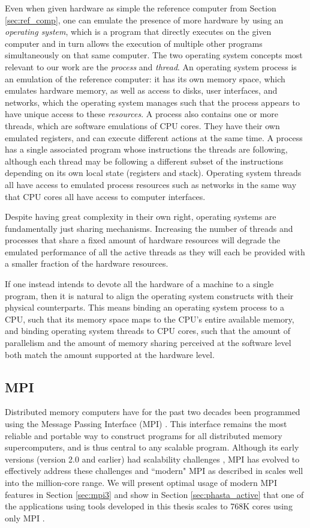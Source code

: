 Even when given hardware as simple the reference
computer from Section \ref{sec:ref_comp}, one can emulate
the presence of more hardware by using an \emph{operating system},
which is a program that directly executes on the given computer
and in turn allows the execution of multiple other programs
simultaneously on that same computer.
The two operating system concepts most relevant to our work
are the \emph{process} and \emph{thread}.
An operating system process is an emulation of the reference computer:
it has its own memory space, which emulates hardware memory,
as well as access to disks, user interfaces, and networks,
which the operating system manages such that the process
appears to have unique access to these \emph{resources}.
A process also contains one or more threads, which are
software emulations of CPU cores.
They have their own emulated registers, and can execute
different actions at the same time.
A process has a single associated program whose instructions
the threads are following, although each thread may be
following a different subset of the instructions depending
on its own local state (registers and stack).
Operating system threads all have access to emulated process
resources such as networks in the same way that CPU cores
all have access to computer interfaces.

Despite having great complexity in their own right, operating
systems are fundamentally just sharing mechanisms.
Increasing the number of threads and processes that share
a fixed amount of hardware resources will degrade the emulated
performance of all the active threads as they will each be
provided with a smaller fraction of the hardware resources.

If one instead intends to devote all the hardware of a machine
to a single program, then it is natural to align the operating
system constructs with their physical counterparts.
This means binding an operating system process to a CPU, such
that its memory space maps to the CPU's entire available memory,
and binding operating system threads to CPU cores, such that
the amount of parallelism and the amount of memory sharing
perceived at the software level both
match the amount supported at the hardware level.

\subsection{MPI}
\label{sec:def_mpi}

Distributed memory computers have for the past two decades
been programmed using the Message Passing Interface (MPI)
\cite{hempel1994mpi,walker1996mpi}.
This interface remains the most reliable and portable way to construct
programs for all distributed memory supercomputers,
and is thus central to any scalable program.
Although its early versions (version 2.0 and earlier) had
scalability challenges \cite{balaji2009mpi}, MPI has evolved
to effectively address these challenges and ``modern" MPI
as described in \cite{gropp2014using} scales well into the
million-core range.
We will present optimal usage of modern MPI features in
Section \ref{sec:mpi3} and show in Section \ref{sec:phasta_active}
that one of the applications using tools developed
in this thesis scales to 768K cores using only MPI \cite{rasquinCise2014}.

